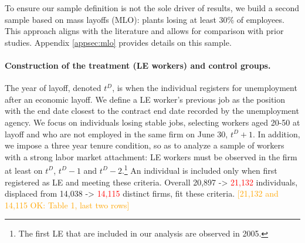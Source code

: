 To ensure our sample definition is not the sole driver of results, we build a second sample based on mass layoffs (MLO): plants losing at least 30\% of employees. This approach aligns with the literature and allows for comparison with prior studies. Appendix \ref{appsec:mlo} provides details on this sample.

\paragraph{Construction of the treatment (LE workers) and control groups.} 

The year of layoff, denoted $t^D$, is when the individual registers for unemployment after an economic layoff. We define a LE worker's previous job as the position with the end date closest to the contract end date recorded by the unemployment agency. We focus on individuals losing stable jobs, selecting workers aged 20-50 at layoff %
and who are not employed in the same firm on June 30, $t^D+1$. In addition, we impose a three year tenure condition, so as to analyze a sample of workers with a strong labor market attachment: LE workers must be observed in the firm at least on $t^D$, $t^D-1$ and $t^D-2$.\footnote{The first LE that are included in our analysis are observed in 2005.} %
An individual is included only when first registered as LE and meeting these criteria. Overall 20,897 -> \textcolor{red}{21,132} individuals, displaced from 14,038 -> \textcolor{red}{14,115} distinct firms, fit these criteria. \textcolor{orange}{[21,132 and 14,115 OK: Table 1, last two rows]}
 
